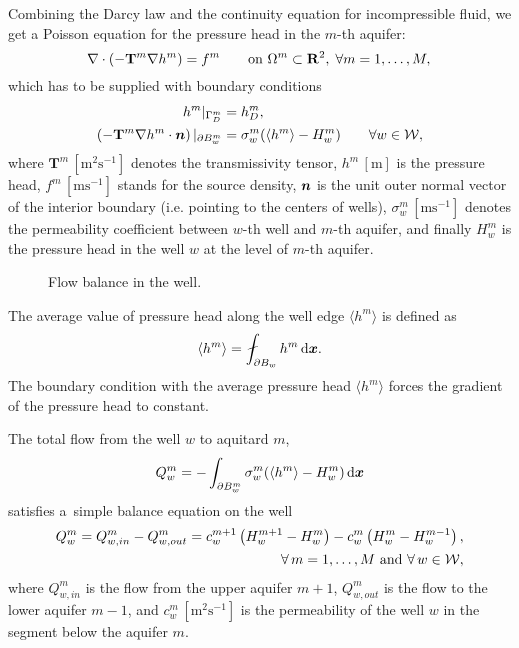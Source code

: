 Combining the Darcy law and the continuity equation for incompressible fluid, we get
a Poisson equation for the pressure head in the $m$-th aquifer:
\begin{equation} \label{eqn:poisson}
\nabla\cdot(-\mathbf{T}^m\nabla h^m) = f^m \qquad \textrm{on } \Omega^m\subset{\rm\bf R}^2,\; \forall m=1,\dots,M, \\
\end{equation}
which has to be supplied with boundary conditions
\begin{align}
h^m|_{\Gamma^m_D} &= h^m_D, \\
\label{eq:interior_bc}
\left(-\mathbf{T}^m\nabla h^m\cdot\mathbf{\boldsymbol{n}}\right)|_{\partial B^m_w} &= \sigma^m_w(\langle h^m \rangle - H^m_w) \qquad \forall w\in\mathcal{W},
\end{align}
%
where $\mathbf{T}^m\, [\textrm{m}^2\textrm{s}^{-1}]$ denotes the transmissivity tensor,
$h^m\, [\textrm{m}]$ is the pressure head, $f^m\, [\textrm{m}\textrm{s}^{-1}]$ stands for the source density,
$\mathbf{\boldsymbol{n}}$ is the unit outer normal vector of the interior boundary (i.e. pointing to the centers of wells),
$\sigma^m_w\, [\textrm{m}\textrm{s}^{-1}]$ denotes the permeability coefficient between $w$-th well and 
$m$-th aquifer, and finally $H_w^m$ is the pressure head in the well $w$ at the level of $m$-th aquifer.
%
\begin{figure}[!htb]
  \begin{center}         
    \def\svgwidth{0.5\textwidth}
    
  \end{center}
  \caption{Flow balance in the well.}
  \label{fig:well_flows}
\end{figure}
%
The average value of pressure head along the well edge $\langle{h^m}\rangle$ is defined as
\[\langle{h^m}\rangle = \fint_{\partial B_w} h^m  \dd\bx.\]
The boundary condition with the average pressure head $\langle{h^m}\rangle$ forces the gradient
of the pressure head to constant.

The total flow from the well $w$ to aquitard $m$,
\[
    Q^m_w =-\int_{\partial B^m_w} \sigma^m_w(\langle h^m \rangle - H^m_w)  \,{\rm d}\mathbf{\boldsymbol{x}}
\]
satisfies a~simple balance equation on the well
\begin{align}
    \label{eq:well_flow}
    Q_w^m = Q^m_{w,in} - Q^m_{w,out} = c^{m+1}_w\left( H^{m+1}_w-H^m_w \right) - c_w^m\left( H^m_w-H_w^{m-1}\right),&\\
    \notag
    \forall\,m=1,\dots,M\text{ and }\forall\,w\in\mathcal{W},&
\end{align}
where $Q^m_{w,in}$ is the flow from the upper aquifer $m+1$, $Q^m_{w,out}$ is the flow to the lower aquifer $m-1$, and 
$c^m_w\, [\textrm{m}^2\textrm{s}^{-1}]$ is the permeability of the well $w$ in the segment below the aquifer $m$.

